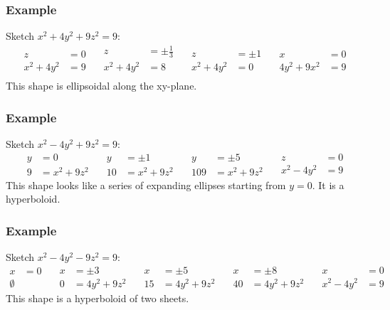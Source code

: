 \documentclass[letterpaper, 12pt]{math}
\begin{document}
\subsubsection*{Example}
Sketch \( x^2+4y^2+9z^2 = 9 \):
\[ \begin{split}
  z &= 0 \\
  x^2+4y^2 &= 9
\end{split}\quad\begin{split}
  z &= \pm\frac{1}{3} \\
  x^2+4y^2 &= 8 \\
\end{split}\quad\begin{split}
  z &= \pm1 \\
  x^2+4y^2 &= 0
\end{split}\quad\begin{split}
  x &= 0 \\
  4y^2+9x^2 &= 9
\end{split} \]
This shape is ellipsoidal along the xy-plane.

\subsubsection*{Example}
Sketch \( x^2-4y^2+9z^2 = 9 \):
\[ \begin{split}
  y &= 0 \\
  9 &= x^2+9z^2
\end{split}\quad\begin{split}
  y &= \pm1 \\
  10 &= x^2+9z^2
\end{split}\quad\begin{split}
  y &= \pm5 \\
  109 &= x^2+9z^2
\end{split}\quad\begin{split}
  z &= 0 \\
  x^2-4y^2 &= 9
\end{split} \]
This shape looks like a series of expanding ellipses starting from \( y = 0 \).
It is a hyperboloid.

\subsubsection*{Example}
Sketch \( x^2-4y^2-9z^2 = 9 \):
\[ \begin{split}
  x &= 0 \\
  \emptyset
\end{split}\quad\begin{split}
  x &= \pm3 \\
  0 &= 4y^2+9z^2
\end{split}\quad\begin{split}
  x &= \pm5 \\
  15 &= 4y^2+9z^2
\end{split}\quad\begin{split}
  x &= \pm8 \\
  40 &= 4y^2+9z^2
\end{split}\quad\begin{split}
  x &= 0 \\
  x^2-4y^2 &= 9
\end{split} \]
This shape is a hyperboloid of two sheets.
\end{document}
